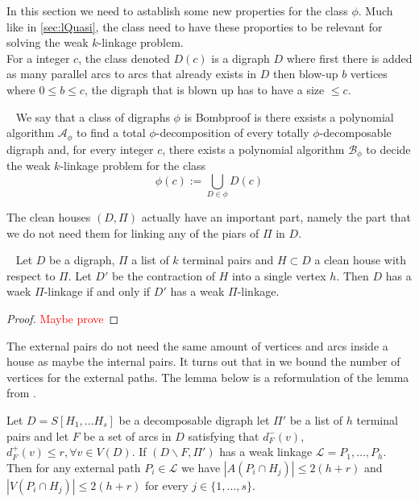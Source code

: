 In this section we need to astablish some new properties for the class $\phi$. Much like in \autoref{sec:lQuasi}, the class need to have these proporties to be relevant for solving the weak $k$-linkage problem.\\ 
For a integer $c$, the class denoted $D(c)$ is a digraph $D$ where first there is added as many parallel arcs to arcs that already exists in $D$ then blow-up $b$ vertices where $0\leq b\leq c$, the digraph that is blown up has to have a size $\leq c$. 

\begin{definition}~\cite{bangJGT85}
    We say that a class of digraphs $\phi$ is Bombproof is there exsists a polynomial algorithm $\mathcal{A}_{\phi}$ to find a total $\phi$-decomposition of every totally $\phi$-decomposable digraph and, for every integer $c$, there exists a polynomial algorithm  $\mathcal{B}_{\phi}$ to decide the weak $k$-linkage problem for the class
    \begin{equation}
        \phi(c):=\bigcup_{D\in \phi}D(c) 
    \end{equation}
    \label{def:bombproof}
\end{definition}
The clean houses $(D,\Pi)$ actually have an important part, namely the part that we do not need them for linking any of the piars of $\Pi$ in $D$.
\begin{lemma}~\cite{bangJGT85}
    Let $D$ be a digraph, $\Pi$ a list of $k$ terminal pairs and $H\subset D$ a clean house with respect to $\Pi$. Let $D'$ be the contraction of $H$ into a single vertex $h$. Then $D$ has a waek $\Pi$-linkage if and only if $D'$ has a weak $\Pi$-linkage.  
    \label{lemma:cleanhouse}
\end{lemma}
\begin{proof}
    \textcolor{red}{Maybe prove}
\end{proof}
The external pairs do not need the same amount of vertices and arcs inside a house as maybe the internal pairs. It turns out that in \cite{bangJGT77} we bound the number of vertices for the external paths. The lemma below is a reformulation of the lemma from \cite{bangJGT77}. 
\begin{lemma}
    Let $D=S[H_1,\dots H_s]$ be a decomposable digraph let $\Pi '$ be a list of $h$ terminal pairs and let $F$ be a set of arcs in $D$ satisfying that $d^-_F(v)$, $d^+_F(v)\leq r, \forall v\in V(D)$.
    If $(D\backslash F , \Pi')$ has a weak linkage $\mathcal{L}=P_1,\dots ,P_h$. 
    Then for any external path $P_i\in \mathcal{L}$ we have $|A(P_i\cap H_j)|\leq 2(h+r)$ and $|V(P_i\cap H_j)|\leq 2(h+r)$ for every $j\in \lbrace 1,\dots ,s\rbrace$.
    \label{lemma:external}
\end{lemma}


